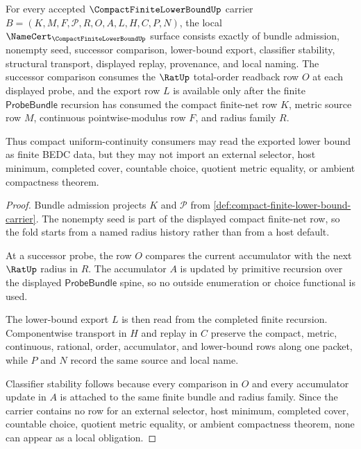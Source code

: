 \begin{theorem}
\label{thm:compact-finite-lower-bound-namecert-obligations}
For every accepted $\CompactFiniteLowerBoundUp$ carrier $B=(K,M,F,\mathcal{P},R,O,A,L,H,C,P,N)$, the local $\NameCert_{\CompactFiniteLowerBoundUp}$ surface consists exactly of bundle admission, nonempty seed, successor comparison, lower-bound export, classifier stability, structural transport, displayed replay, provenance, and local naming. The successor comparison consumes the $\RatUp$ total-order readback row $O$ at each displayed probe, and the export row $L$ is available only after the finite $\mathsf{ProbeBundle}$ recursion has consumed the compact finite-net row $K$, metric source row $M$, continuous pointwise-modulus row $F$, and radius family $R$.

Thus compact uniform-continuity consumers may read the exported lower bound as finite BEDC data, but they may not import an external selector, host minimum, completed cover, countable choice, quotient metric equality, or ambient compactness theorem.
\end{theorem}
\begin{proof}
Bundle admission projects $K$ and $\mathcal{P}$ from \autoref{def:compact-finite-lower-bound-carrier}. The nonempty seed is part of the displayed compact finite-net row, so the fold starts from a named radius history rather than from a host default.

At a successor probe, the row $O$ compares the current accumulator with the next $\RatUp$ radius in $R$. The accumulator $A$ is updated by primitive recursion over the displayed $\mathsf{ProbeBundle}$ spine, so no outside enumeration or choice functional is used.

The lower-bound export $L$ is then read from the completed finite recursion. Componentwise transport in $H$ and replay in $C$ preserve the compact, metric, continuous, rational, order, accumulator, and lower-bound rows along one packet, while $P$ and $N$ record the same source and local name.

Classifier stability follows because every comparison in $O$ and every accumulator update in $A$ is attached to the same finite bundle and radius family. Since the carrier contains no row for an external selector, host minimum, completed cover, countable choice, quotient metric equality, or ambient compactness theorem, none can appear as a local obligation.
\end{proof}

